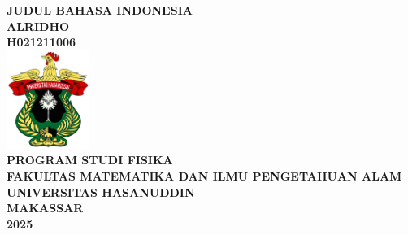 \begingroup
\fontsize{11pt}{13pt}\selectfont
\begin{center}
    \textbf{JUDUL BAHASA INDONESIA} \\
    \vfill
    \textbf{ALRIDHO} \\
    \textbf{H021211006} \\
    \vspace*{1.5cm}
    \includegraphics[height=3.2cm]{gambar/uh-fc.png} \\
    \vfill
    \textbf{PROGRAM STUDI FISIKA} \\
    \textbf{FAKULTAS MATEMATIKA DAN ILMU PENGETAHUAN ALAM} \\
    \textbf{UNIVERSITAS HASANUDDIN} \\
    \textbf{MAKASSAR} \\
    \textbf{2025}
\end{center}
\endgroup
\restoregeometry
